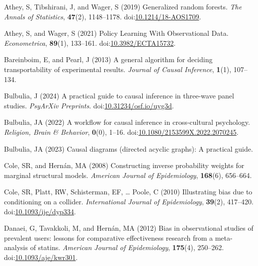 \documentclass[
  single column]{article}
\newlength{\cslhangindent}
\newenvironment{CSLReferences}[2] %
 {\begin{list}{}{%
  \setlength{\itemindent}{0pt}
  \setlength{\leftmargin}{0pt}
  \setlength{\parsep}{0pt}
  \ifodd #1
   \setlength{\leftmargin}{\cslhangindent}
   \setlength{\itemindent}{-1\cslhangindent}
  \fi
  \setlength{\itemsep}{#2\baselineskip}}}
 {\end{list}}
\begin{document}
\label{refs}
\begin{CSLReferences}{1}{0}
Athey, S, Tibshirani, J, and Wager, S (2019) Generalized random forests.
\emph{The Annals of Statistics}, \textbf{47}(2), 1148--1178.
doi:\href{https://doi.org/10.1214/18-AOS1709}{10.1214/18-AOS1709}.

Athey, S, and Wager, S (2021) Policy Learning With Observational Data.
\emph{Econometrica}, \textbf{89}(1), 133--161.
doi:\href{https://doi.org/10.3982/ECTA15732}{10.3982/ECTA15732}.

Bareinboim, E, and Pearl, J (2013) A general algorithm for deciding
transportability of experimental results. \emph{Journal of Causal
Inference}, \textbf{1}(1), 107--134.

Bulbulia, J (2024) A practical guide to causal inference in three-wave
panel studies. \emph{PsyArXiv Preprints}.
doi:\href{https://doi.org/10.31234/osf.io/uyg3d}{10.31234/osf.io/uyg3d}.

Bulbulia, JA (2022) A workflow for causal inference in cross-cultural
psychology. \emph{Religion, Brain \& Behavior}, \textbf{0}(0), 1--16.
doi:\href{https://doi.org/10.1080/2153599X.2022.2070245}{10.1080/2153599X.2022.2070245}.

Bulbulia, JA (2023) Causal diagrams (directed acyclic graphs): A
practical guide.

Cole, SR, and Hernán, MA (2008) Constructing inverse probability weights
for marginal structural models. \emph{American Journal of Epidemiology},
\textbf{168}(6), 656--664.

Cole, SR, Platt, RW, Schisterman, EF, \ldots{} Poole, C (2010)
Illustrating bias due to conditioning on a collider. \emph{International
Journal of Epidemiology}, \textbf{39}(2), 417--420.
doi:\href{https://doi.org/10.1093/ije/dyp334}{10.1093/ije/dyp334}.

Danaei, G, Tavakkoli, M, and Hernán, MA (2012) Bias in observational
studies of prevalent users: lessons for comparative effectiveness
research from a meta-analysis of statins. \emph{American Journal of
Epidemiology}, \textbf{175}(4), 250--262.
doi:\href{https://doi.org/10.1093/aje/kwr301}{10.1093/aje/kwr301}.


\end{CSLReferences}
\end{document}
